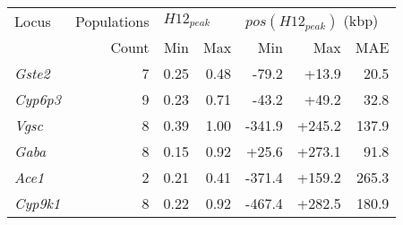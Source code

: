 \begin{tabular}{lrrrrrr}
\toprule
           Locus & Populations & \multicolumn{2}{l}{$H12_{peak}$} & \multicolumn{3}{l}{$pos(H12_{peak})$ (kbp)} \\
                 &       Count &          Min &  Max &                     Min &    Max &   MAE \\
\midrule
  \textit{Gste2} &           7 &         0.25 & 0.48 &                   -79.2 &  +13.9 &  20.5 \\
 \textit{Cyp6p3} &           9 &         0.23 & 0.71 &                   -43.2 &  +49.2 &  32.8 \\
   \textit{Vgsc} &           8 &         0.39 & 1.00 &                  -341.9 & +245.2 & 137.9 \\
   \textit{Gaba} &           8 &         0.15 & 0.92 &                   +25.6 & +273.1 &  91.8 \\
   \textit{Ace1} &           2 &         0.21 & 0.41 &                  -371.4 & +159.2 & 265.3 \\
 \textit{Cyp9k1} &           8 &         0.22 & 0.92 &                  -467.4 & +282.5 & 180.9 \\
\bottomrule
\end{tabular}
